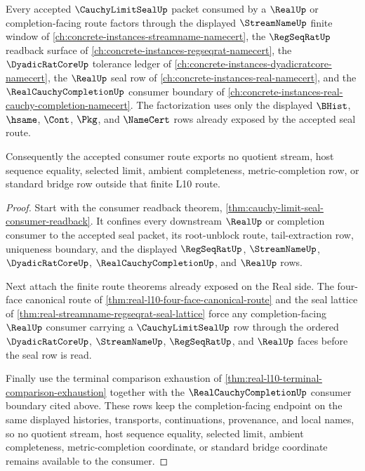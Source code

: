 \begin{theorem}
\label{thm:cauchy-limit-seal-regseqrat-streamname-route-lock}
Every accepted $\CauchyLimitSealUp$ packet consumed by a $\RealUp$ or completion-facing route factors through the displayed $\StreamNameUp$ finite window of \autoref{ch:concrete-instances-streamname-namecert}, the $\RegSeqRatUp$ readback surface of \autoref{ch:concrete-instances-regseqrat-namecert}, the $\DyadicRatCoreUp$ tolerance ledger of \autoref{ch:concrete-instances-dyadicratcore-namecert}, the $\RealUp$ seal row of \autoref{ch:concrete-instances-real-namecert}, and the $\RealCauchyCompletionUp$ consumer boundary of \autoref{ch:concrete-instances-real-cauchy-completion-namecert}. The factorization uses only the displayed $\BHist$, $\hsame$, $\Cont$, $\Pkg$, and $\NameCert$ rows already exposed by the accepted seal route.

Consequently the accepted consumer route exports no quotient stream, host sequence equality, selected limit, ambient completeness, metric-completion row, or standard bridge row outside that finite L10 route.
\end{theorem}
\begin{proof}
Start with the consumer readback theorem, \autoref{thm:cauchy-limit-seal-consumer-readback}. It confines every downstream $\RealUp$ or completion consumer to the accepted seal packet, its root-unblock route, tail-extraction row, uniqueness boundary, and the displayed $\RegSeqRatUp$, $\StreamNameUp$, $\DyadicRatCoreUp$, $\RealCauchyCompletionUp$, and $\RealUp$ rows.

Next attach the finite route theorems already exposed on the Real side. The four-face canonical route of \autoref{thm:real-l10-four-face-canonical-route} and the seal lattice of \autoref{thm:real-streamname-regseqrat-seal-lattice} force any completion-facing $\RealUp$ consumer carrying a $\CauchyLimitSealUp$ row through the ordered $\DyadicRatCoreUp$, $\StreamNameUp$, $\RegSeqRatUp$, and $\RealUp$ faces before the seal row is read.

Finally use the terminal comparison exhaustion of \autoref{thm:real-l10-terminal-comparison-exhaustion} together with the $\RealCauchyCompletionUp$ consumer boundary cited above. These rows keep the completion-facing endpoint on the same displayed histories, transports, continuations, provenance, and local names, so no quotient stream, host sequence equality, selected limit, ambient completeness, metric-completion coordinate, or standard bridge coordinate remains available to the consumer.
\end{proof}
